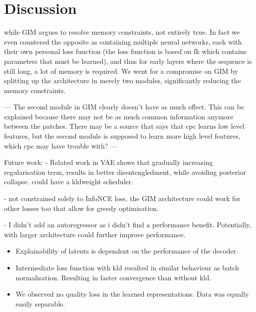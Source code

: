 \documentclass[]{book}
\begin{document}
\newcommand{\genc}[0]{g_{enc}(\cdot)}
\newcommand{\gar}[0]{g_{ar}(\cdot)}

\newcommand{\Lvnce}[0]{\mathcal{L}_{\text{V-NCE}}}
\newcommand{\Lnce}[0]{\mathcal{L}_{\text{NCE}}}











\chapter{Discussion}
while GIM argues to resolve memory constraints, not entirely true. In fact we even countered the opposite as containing multiple neural networks, each with their own personal loss function (the loss function is based on fk which contains parameters that must be learned), and thus for early layers where the sequence is still long, a lot of memory is required. We went for a compromise on GIM by splitting up the architecture in merely two modules, significantly reducing the memory constraints.


---
The second module in GIM clearly doesn't have as much effect. This can be explained because there may not be as much common information anymore between the patches. There may be a source that says that cpc learns low level features, but the second module is supposed to learn more high level features, which cpc may have trouble with?
---

Future work:
 - Related work in VAE shows that gradually increasing regularisation term, results in better disentengledment, while avoiding posterior collapse. could have a kldweight scheduler.
 
- not constrained solely to InfoNCE loss, the GIM architecture could work for other losses too that allow for greedy optimisation.


- I didn't add an autoregressor as i didn't find a performance benefit. Potentially, with larger architecture could further improve performance.



\begin{itemize}
	\item Explainability of latents is dependent on the performance of the decoder.
	\item Intermediate loss function with kld resulted in similar behaviour as batch normalisation. Resulting in faster convergence than without kld.
	\item We observed no quality loss in the learned representations. Data was equally easily separable.
\end{itemize}






\end{document}
